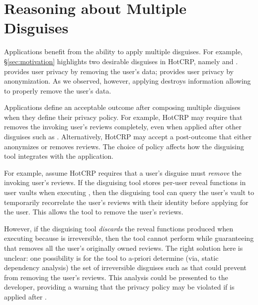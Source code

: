 \section{Reasoning about Multiple Disguises}

Applications benefit from the ability to apply multiple disguises. For example,
\S\ref{sec:motivation} highlights two desirable disguises in HotCRP, namely \gdpr and \ca. \gdpr
provides user privacy by removing the user's data; \ca provides user privacy by anonymization.
As we observed, however, applying \ca destroys information allowing \gdpr to properly remove the
user's data.

Applications define an acceptable outcome after composing multiple disguises when they define their
privacy policy.
For example, HotCRP may require that \gdpr removes the invoking user's reviews completely, even when
applied after other disguises such as \ca.  Alternatively, HotCRP may accept a post-\gdpr outcome that either
anonymizes or removes reviews. 
The choice of policy affects how the disguising tool integrates with the application.

For example, assume HotCRP requires that a user's \gdpr disguise must \emph{remove} the invoking
user's reviews. If the disguising tool stores per-user reveal functions in user vaults when
executing \ca, then the disguising tool can query the user's vault to temporarily recorrelate the
user's reviews with their identity before applying \gdpr for the user.  This allows the tool to
remove the user's reviews.
%

However, if the disguising tool \emph{discards} the reveal functions produced when executing \ca
because \ca is irreversible, then the tool cannot perform \gdpr while guaranteeing that \gdpr
removes all the user's originally owned reviews.  The right solution here is unclear: one
possibility is for the tool to a-priori determine (via, \eg static dependency analysis) the set of
irreversible disguises such as \ca that could prevent \gdpr from removing the user's reviews. This
analysis could be presented to the developer, providing a warning that the privacy policy may be
violated if \gdpr is applied after \ca.

